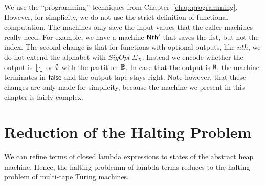 We use the ``programming'' techniques from Chapter~\ref{chap:programming}.  However, for simplicity, we do not use the strict definition of functional
computation.  The machines only save the input-values that the caller machines really need.  For example, we have a machine $\mathsf{Nth'}$ that saves the
list, but not the index.  The second change is that for functions with optional outputs, like $nth$, we do not extend the alphabet with
$SigOpt~\Sigma_X$.  Instead we encode whether the output is $\left\lfloor {\cdot} \right\rfloor$ or $\emptyset$ with the partition $\mathbb{B}$.  In case that the output is $\emptyset$,
the machine terminates in $\mathsf{false}$ and the output tape stays right.  Note however, that these changes are only made for simplicity, because the
machine we present in this chapter is fairly complex.




\section{Reduction of the Halting Problem}
\label{sec:halting-problem}

We can refine terms of closed lambda expressions to states of the abstract heap machine.  Hence, the halting problemm of lambda terms reduces to the
halting problem of multi-tape Turing machines.





